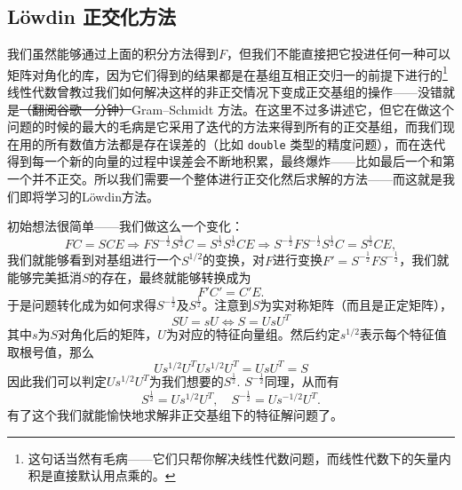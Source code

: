 \documentclass[12pt,a4paper,openany,twoside]{book}
\numberwithin{equation}{section}
\begin{document}
          \subsection{L\"owdin 正交化方法}
            我们虽然能够通过上面的积分方法得到$F$，但我们不能直接把它投进任何一种可以矩阵对角化的库，因为它们得到的结果都是在基组互相正交归一的前提下进行的\footnote{这句话当然有毛病——它们只帮你解决线性代数问题，而线性代数下的矢量内积是直接默认用点乘的。}线性代数曾教过我们如何解决这样的非正交情况下变成正交基组的操作——没错就是\sout{（翻阅谷歌一分钟）}Gram–Schmidt 方法。在这里不过多讲述它，但它在做这个问题的时候的最大的毛病是它采用了迭代的方法来得到所有的正交基组，而我们现在用的所有数值方法都是存在误差的（比如 \lstinline$double$ 类型的精度问题），而在迭代得到每一个新的向量的过程中误差会不断地积累，最终爆炸——比如最后一个和第一个并不正交。所以我们需要一个整体进行正交化然后求解的方法——而这就是我们即将学习的L\"owdin方法。

            初始想法很简单——我们做这么一个变化：
            \[
                FC = SCE \Rightarrow F S^{-\frac{1}{2}}S^{\frac{1}{2}} C = S^{\frac{1}{2}}S^{\frac{1}{2}} C E \Rightarrow S^{-\frac{1}{2}} F S^{-\frac{1}{2}} S^{\frac{1}{2}}C = S^{\frac{1}{2}} C E,
            \] 
            我们就能够看到对基组进行一个$S^{1/2}$的变换，对$F$进行变换$F' = S^{-\frac{1}{2}} F S^{-\frac{1}{2}}$，我们就能够完美抵消$S$的存在，最终就能够转换成为
            \begin{equation}
                F' C' = C' E.
            \end{equation}
            于是问题转化成为如何求得$S^{-\frac{1}{2}}$及$S^{\frac{1}{2}}$。注意到$S$为实对称矩阵（而且是正定矩阵），
            \begin{equation}
                S U = s U \Leftrightarrow S = U s U^{T}
            \end{equation}
            其中$s$为$S$对角化后的矩阵，$U$为对应的特征向量组。然后约定$s^{1/2}$表示每个特征值取根号值，那么
            \begin{equation}
                U s^{1/2} U^{T} U s^{1/2} U^{T} = U s U^{T} = S
            \end{equation}
            因此我们可以判定$U s^{1/2} U^{T}$为我们想要的$S^{\frac{1}{2}}$. $S^{-\frac{1}{2}}$同理，从而有
            \begin{equation}
                S^{\frac{1}{2}} = U s^{1/2} U^{T}, \quad S^{-\frac{1}{2}} =  U s^{-1/2} U^{T}.
            \end{equation}
            有了这个我们就能愉快地求解非正交基组下的特征解问题了。
\end{document}

